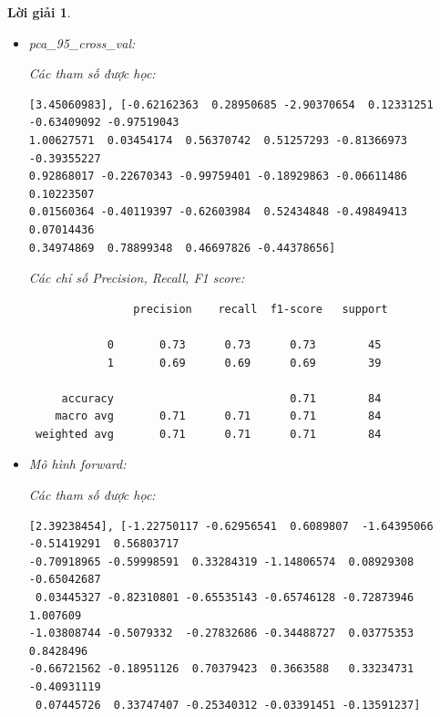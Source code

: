 \documentclass[14pt, a4paper]{article}
\theoremstyle{sltheorem}
\theoremstyle{soltheorem}
\newtheorem*{loigiai}{Lời giải}
\begin{document}
\begin{loigiai}
\begin{itemize}
        Các chỉ số Precision, Recall, F1 score:
        \begin{verbatim}
                precision    recall  f1-score   support

            0       0.88      0.98      0.93        45
            1       0.97      0.85      0.90        39
 
     accuracy                           0.92        84
    macro avg       0.93      0.91      0.92        84
 weighted avg       0.92      0.92      0.92        84
        \end{verbatim}

        \item pca\_95\_cross\_val:
        
        Các tham số được học:

        \begin{verbatim}
[3.45060983], [-0.62162363  0.28950685 -2.90370654  0.12331251 -0.63409092 -0.97519043
1.00627571  0.03454174  0.56370742  0.51257293 -0.81366973 -0.39355227
0.92868017 -0.22670343 -0.99759401 -0.18929863 -0.06611486  0.10223507
0.01560364 -0.40119397 -0.62603984  0.52434848 -0.49849413  0.07014436
0.34974869  0.78899348  0.46697826 -0.44378656]
        \end{verbatim}

        Các chỉ số Precision, Recall, F1 score:

        \begin{verbatim}
                precision    recall  f1-score   support

            0       0.73      0.73      0.73        45
            1       0.69      0.69      0.69        39
 
     accuracy                           0.71        84
    macro avg       0.71      0.71      0.71        84
 weighted avg       0.71      0.71      0.71        84
        \end{verbatim}

        \item Mô hình forward:
        
        Các tham số được học:

        \begin{verbatim}
[2.39238454], [-1.22750117 -0.62956541  0.6089807  -1.64395066 -0.51419291  0.56803717
-0.70918965 -0.59998591  0.33284319 -1.14806574  0.08929308 -0.65042687
 0.03445327 -0.82310801 -0.65535143 -0.65746128 -0.72873946  1.007609
-1.03808744 -0.5079332  -0.27832686 -0.34488727  0.03775353  0.8428496
-0.66721562 -0.18951126  0.70379423  0.3663588   0.33234731 -0.40931119
 0.07445726  0.33747407 -0.25340312 -0.03391451 -0.13591237]
        \end{verbatim}


\end{itemize}
\end{loigiai}
\end{document}
